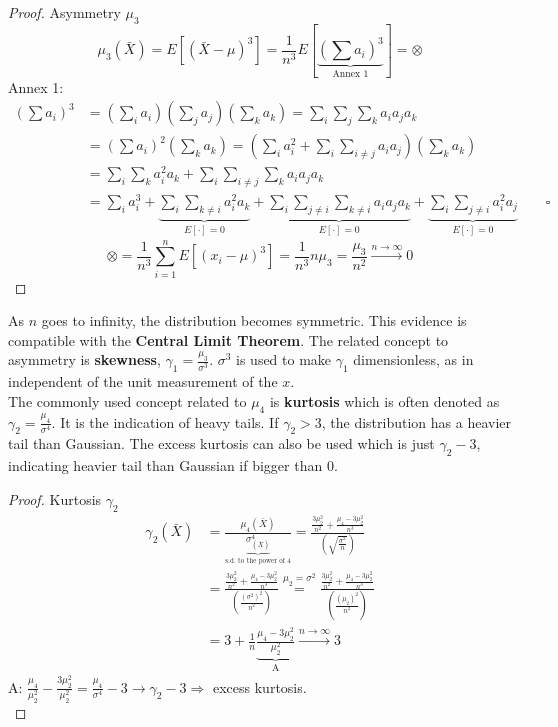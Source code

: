 \begin{proof}
    Asymmetry $\mu_3$
    \begin{equation*}
        \mu_3(\bar{X}) = E[(\bar{X}-\mu)^3] = \frac{1}{n^3}E[\underbrace{(\sum a_i)^3}_{\text{Annex 1}}] = \otimes
    \end{equation*}
    Annex 1: 
    \begin{align*}
        (\sum a_i)^3 & = (\sum_i a_i)(\sum_j a_j)(\sum_k a_k) = \sum_i\sum_j\sum_k a_ia_ja_k\\
        & = (\sum a_i)^2(\sum_k a_k) = (\sum_i a_i^2 + \sum_i\sum_{i\neq j}a_ia_j)(\sum_k a_k)\\
        & = \sum_i\sum_k a_i^2 a_k + \sum_i\sum_{i\neq j}\sum_k a_ia_ja_k\\
        & = \sum_i a_i^3 + \underbrace{\sum_i\sum_{k\neq i}a_i^2 a_k}_{E[\cdot]=0} + \underbrace{\sum_i\sum_{j\neq i}\sum_{k\neq i}a_ia_ja_k}_{E[\cdot]=0}
        + \underbrace{\sum_i\sum_{j\neq i}a_i^2 a_j}_{E[\cdot]=0}\qquad\square
    \end{align*}
    \begin{equation*}
        \otimes = \frac{1}{n^3}\sum_{i=1}^{n}E[(x_i-\mu)^3] = \frac{1}{n^3}n\mu_3 = \frac{\mu_3}{n^2}\xrightarrow{n\to\infty} 0
    \end{equation*}
\end{proof}
As $n$ goes to infinity, the distribution becomes symmetric. This evidence is compatible with the \textbf{Central Limit Theorem}.
The related concept to asymmetry is \textbf{skewness}, $\gamma_1 = \frac{\mu_3}{\sigma^3}$. 
$\sigma^3$ is used to make $\gamma_1$ dimensionless, as in independent of the unit measurement of the $x$.\\

The commonly used concept related to $\mu_4$ is \textbf{kurtosis} which is often denoted as $\gamma_2 = \frac{\mu_4}{\sigma^4}$. 
It is the indication of heavy tails. If $\gamma_2 > 3$, the distribution has a heavier tail than Gaussian.
The excess kurtosis can also be used which is just $\gamma_2 - 3$, indicating heavier tail than Gaussian if bigger than 0.
\begin{proof}
    Kurtosis $\gamma_2$
    \begin{align*}
        \gamma_2(\bar{X}) & = \frac{\mu_4(\bar{X})}{\underbrace{\sigma_{(\bar{X})}^4}_{\text{s.d. to the power of 4}}} = \frac{\frac{3\mu_2^2}{n^2}+\frac{\mu_4-3\mu_2^2}{n^3}}{(\sqrt{\frac{\sigma^2}{n}})}\\
        & = \frac{\frac{3\mu_2^2}{n^2}+\frac{\mu_4-3\mu_2^2}{n^3}}{(\frac{(\sigma^2)^2}{n^2})} \overset{\mu_2 = \sigma^2}{=} \frac{\frac{3\mu_2^2}{n^2}+\frac{\mu_4-3\mu_2^2}{n^3}}{(\frac{(\mu_2)^2}{n^2})}\\
        & = 3 + \frac{1}{n}\underbrace{\frac{\mu_4-3\mu_2^2}{\mu_2^2}}_{\text{A}}\xrightarrow{n\to\infty} 3
    \end{align*}
    A: $\frac{\mu_4}{\mu_2^2}-\frac{3\mu_2^2}{\mu_2^2} = \frac{\mu_4}{\sigma^4}-3 \to \gamma_2 - 3 \Rightarrow$ excess kurtosis.\\
\end{proof}

